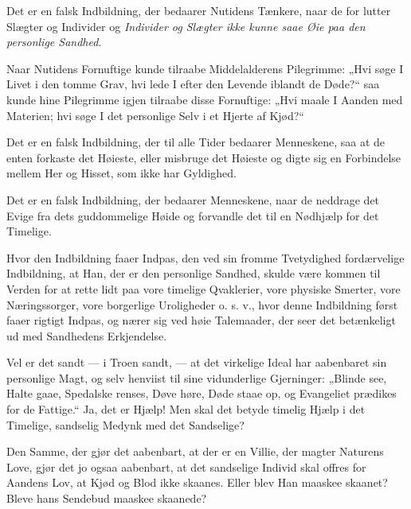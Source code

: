 \documentclass[12pt,a4paper]{book}
\newcommand{\apage}[1]{\marginnote{\footnotesize\textit{[#1]}}}
\begin{document}
Det er en falsk Indbildning, der bedaarer Nutidens Tænkere, naar de
for lutter Slægter og Individer og \emph{Individer og Slægter ikke
kunne saae Øie paa den personlige Sandhed}.
 \apage{136}

Naar Nutidens Fornuftige kunde tilraabe Middelalderens Pilegrimme:
„Hvi søge I Livet i den tomme Grav, hvi lede I efter den Levende
iblandt de Døde?“ saa kunde hine Pilegrimme igjen tilraabe disse
Fornuftige: „Hvi maale I Aanden med Materien; hvi søge I det
personlige Selv i et Hjerte af Kjød?“

Det er en falsk Indbildning, der til alle Tider bedaarer Menneskene,
saa at de enten forkaste det Høieste, eller misbruge det Høieste og
digte sig en Forbindelse mellem Her og Hisset, som ikke har
Gyldighed.

Det er en falsk Indbildning, der bedaarer Menneskene, naar de
neddrage det Evige fra dets guddommelige Høide og forvandle det
til en Nødhjælp for det Timelige.

Hvor den Indbildning faaer Indpas, den ved sin fromme
Tvetydighed fordærvelige Indbildning, at Han, der er den personlige
Sandhed, skulde være kommen til Verden for at rette lidt paa vore
timelige Qvaklerier, vore physiske Smerter, vore Næringssorger,
vore borgerlige Uroligheder o. s. v., hvor denne Indbildning først
faaer rigtigt Indpas, og nærer sig ved høie Talemaader, der seer det
betænkeligt ud med Sandhedens Erkjendelse.

Vel er det sandt --- i Troen sandt, --- at det virkelige Ideal har
aabenbaret sin personlige Magt, og selv henviist til sine
vidunderlige Gjerninger: „Blinde see, Halte gaae, Spedalske renses,
Døve høre, Døde staae op, og Evangeliet prædikes for de Fattige.“
Ja, det er Hjælp! Men skal det betyde timelig Hjælp i det Timelige,
sandselig Medynk med det Sandselige?

Den Samme, der gjør det aabenbart, at der er en Villie, der magter
Naturens Love, gjør det jo ogsaa aabenbart, at det sandselige Individ
skal offres for Aandens Lov, at Kjød og Blod ikke skaanes. Eller
blev Han maaskee skaanet? Bleve hans Sendebud maaskee skaanede?
\end{document}
